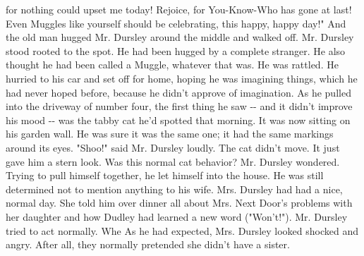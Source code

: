 \documentclass{article}%
\begin{document}
for nothing could upset me today! Rejoice, for You{-}Know{-}Who has gone at
\newline%
last! Even Muggles like yourself should be celebrating, this happy,
\newline%
happy day!"
\newline%
And the old man hugged Mr. Dursley around the middle and walked off.
\newline%
Mr. Dursley stood rooted to the spot. He had been hugged by a complete
\newline%
stranger. He also thought he had been called a Muggle, whatever that
\newline%
was. He was rattled. He hurried to his car and set off for home, hoping
\newline%
he was imagining things, which he had never hoped before, because he
\newline%
didn't approve of imagination.
\newline%
As he pulled into the driveway of number four, the first thing he saw {-}{-}
\newline%
and it didn't improve his mood {-}{-} was the tabby cat he'd spotted that
\newline%
morning. It was now sitting on his garden wall. He was sure it was the
\newline%
same one; it had the same markings around its eyes.
\newline%
"Shoo!" said Mr. Dursley loudly. The cat didn't move. It just gave him a
\newline%
stern look. Was this normal cat behavior? Mr. Dursley wondered. Trying
\newline%
to pull himself together, he let himself into the house. He was still
\newline%
determined not to mention anything to his wife.
\newline%
Mrs. Dursley had had a nice, normal day. She told him over dinner all
\newline%
about Mrs. Next Door's problems with her daughter and how Dudley had
\newline%
learned a new word ("Won't!"). Mr. Dursley tried to act normally. Whe
\newline%
As he had expected, Mrs. Dursley looked shocked and angry. After all,
\newline%
they normally pretended she didn't have a sister.
\newline%
\end{document}
